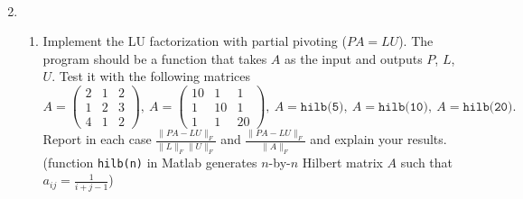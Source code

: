 \documentclass[12pt]{article}
\begin{document}
\begin{enumerate}
$$$$
\
\item
\begin{enumerate}
\item  Implement the LU factorization with partial pivoting ($PA = LU$).  The program should be a function that takes $A$ as the input and outputs $P$, $L$, $U$.  Test it with the following matrices
\begin{equation*} \label{eqn:1}
A =
\begin{pmatrix}
2 & 1 & 2 \\
1 & 2 & 3 \\
4 & 1 & 2
\end{pmatrix},
\
A =
\begin{pmatrix}
10 & 1 & 1 \\
1 & 10 & 1 \\
1 & 1 & 20
\end{pmatrix},
\
A = \texttt{hilb(5)},
\
A = \texttt{hilb(10)},
\
A = \texttt{hilb(20)}.
\end{equation*}
Report in each case $\frac{\| PA - LU \|_F}{\| L\|_F \| U \|_F}$ and $\frac{\| PA - LU \|_{F}}{\| A \|_F}$ and explain your results. (function \texttt{hilb(n)} in Matlab generates $n$-by-$n$ Hilbert matrix $A$ such that $a_{ij} = \frac{1}{i+j-1}$)
\


\end{enumerate}
\end{enumerate}
\end{document}

